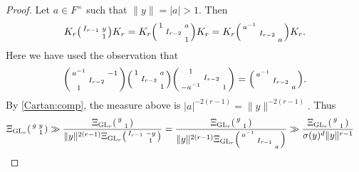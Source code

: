 \documentclass[12pt]{amsart}
\theoremstyle{remark}
\numberwithin{equation}{section}
\newcommand{\GL}{\mathrm{GL}}
\theoremstyle{definition}
\newenvironment{psmatrix}
  {\left(\begin{smallmatrix}}
  {\end{smallmatrix}\right)}
\numberwithin{equation}{subsection}
\newcommand{\norm}[1]{\lVert#1\rVert}
\begin{document}
\begin{proof}
Let $a\in F^\times$ such that $\norm{y}=|a|>1.$ Then
\begin{align} \label{Cartan:comp}
    K_r\begin{psmatrix} I_{r-1} & y \\ & 1 \end{psmatrix}K_r=K_r \begin{psmatrix} 1 & & a \\ & I_{r-2} & \\ & & 1 \end{psmatrix}K_r=K_r \begin{psmatrix} a^{-1} & \\ & I_{r-2} & \\ & & a\end{psmatrix}K_r.
\end{align}
Here we have used the observation that 
$$\begin{psmatrix}  a^{-1} & & -1\\&I_{r-2} & \\ 1 & &  \end{psmatrix} \begin{psmatrix} 1 & & a \\ & I_{r-2} & \\ & & 1 \end{psmatrix}\begin{psmatrix}  1 & & \\ &  I_{r-2} &  \\  -a^{-1} & &  1\end{psmatrix}=\begin{psmatrix} a^{-1} & & \\ & I_{r-2} & \\ & & a \end{psmatrix}.
$$
By \eqref{Cartan:comp}, the measure above is $|a|^{-2(r-1)}=\norm{y}^{-2(r-1)}.$  Thus
\begin{align*}
\Xi_{\GL_r}\begin{psmatrix} g & y \\&1\end{psmatrix} &\gg \frac{\Xi_{\GL_r}\begin{psmatrix} g &  \\ & 1\end{psmatrix}}{\norm{y}^{2(r-1)}\Xi_{\GL_r}\begin{psmatrix} I_{r-1} & -y \\ & 1\end{psmatrix}}=\frac{\Xi_{\GL_r}\begin{psmatrix} g &  \\ & 1\end{psmatrix}}{\norm{y}^{2(r-1)}\Xi_{\GL_r}\begin{psmatrix} a^{-1} & & \\ &I_{r-1} &  \\ & & a\end{psmatrix}}\gg \frac{\Xi_{\GL_r}\begin{psmatrix} g &  \\ & 1\end{psmatrix}}{\sigma(y)^{d}\norm{y}^{r-1}}

\end{align*}
\end{proof}
\end{document}

